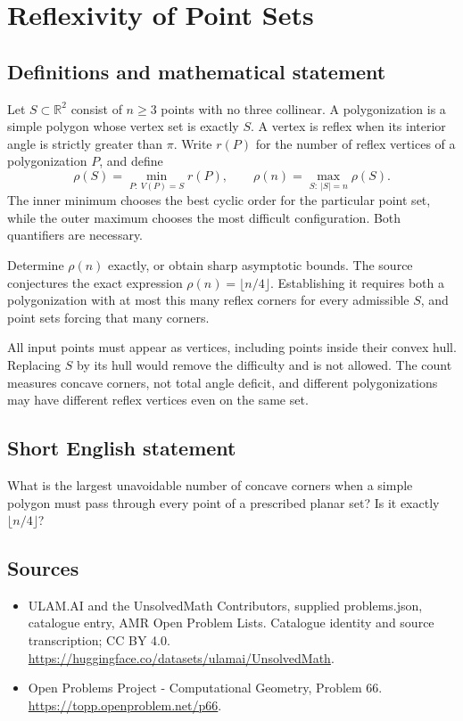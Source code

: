 \documentclass[11pt,a4paper]{article}
\begin{document}
\section*{Reflexivity of Point Sets}\label{statement}

\subsection{Definitions and mathematical statement}
Let $S\subset\mathbb R^2$ consist of $n\ge3$ points with no three
collinear. A polygonization is a simple polygon whose vertex set
is exactly $S$. A vertex is reflex when its interior angle is
strictly greater than $\pi$. Write $r(P)$ for the number of
reflex vertices of a polygonization $P$, and define
\[
 \rho(S)=\min_{P:\ V(P)=S}r(P),\qquad
 \rho(n)=\max_{S:\ |S|=n}\rho(S).
\]
The inner minimum chooses the best cyclic order for the particular
point set, while the outer maximum chooses the most difficult
configuration. Both quantifiers are necessary.

Determine $\rho(n)$ exactly, or obtain sharp asymptotic bounds.
The source conjectures the exact expression
$\rho(n)=\lfloor n/4\rfloor$. Establishing it requires both a
polygonization with at most this many reflex corners for every
admissible $S$, and point sets forcing that many corners.

All input points must appear as vertices, including points inside
their convex hull. Replacing $S$ by its hull would remove the
difficulty and is not allowed. The count measures concave corners,
not total angle deficit, and different polygonizations may have
different reflex vertices even on the same set.
\subsection{Short English statement}
What is the largest unavoidable number of concave corners when
a simple polygon must pass through every point of a prescribed
planar set? Is it exactly $\lfloor n/4\rfloor$?
\subsection{Sources}
\begin{itemize}
\item[S1] ULAM.AI and the UnsolvedMath Contributors, supplied problems.json, catalogue entry, AMR Open Problem Lists. Catalogue identity and source transcription; CC BY 4.0.
\url{https://huggingface.co/datasets/ulamai/UnsolvedMath}.
\item[S2] Open Problems Project - Computational Geometry, Problem 66. 
\url{https://topp.openproblem.net/p66}.
\end{itemize}
\end{document}
